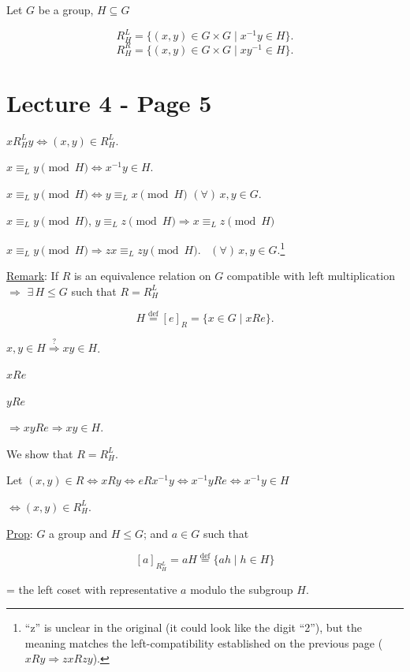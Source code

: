 \bigskip
\noindent Let $G$ be a group, $H\subseteq G$

\[
R_H^L = \{(x,y)\in G\times G \mid x^{-1}y\in H\}.
\]
\[
R_H^R = \{(x,y)\in G\times G \mid xy^{-1}\in H\}.
\]



\section*{Lecture 4 - Page 5}

\noindent $xR_H^L y \Leftrightarrow (x,y)\in R_H^L$.

\noindent $x\equiv_L y \pmod H \Leftrightarrow x^{-1}y\in H$.

\bigskip
\noindent $x\equiv_L y \pmod H \Leftrightarrow y\equiv_L x \pmod H$ $(\forall)\, x,y\in G$.

\noindent $x\equiv_L y \pmod H$, $y\equiv_L z \pmod H \Rightarrow x\equiv_L z \pmod H$

\bigskip
\noindent $x\equiv_L y \pmod H \Rightarrow zx\equiv_L zy \pmod H$. \ $(\forall)\, x,y\in G$.\footnote{``z'' is unclear in the original (it could look like the digit ``2''), but the meaning matches the left-compatibility established on the previous page ($xRy\Rightarrow zxRzy$).}

\bigskip
\noindent\underline{Remark}: If $R$ is an equivalence relation on $G$ compatible with left multiplication $\Rightarrow$ $\exists\, H\leq G$ such that $R=R_H^L$

\[
H \overset{\text{def}}{=} [e]_R = \{x\in G \mid xRe\}.
\]

\noindent $x,y\in H \overset{?}{\Rightarrow} xy\in H$.

\noindent $xRe$

\noindent $yRe$

\noindent $\Rightarrow xyRe \Rightarrow xy\in H$.

\bigskip
\noindent We show that $R=R_H^L$.

\noindent Let $(x,y)\in R \Leftrightarrow xRy \Leftrightarrow eRx^{-1}y \Leftrightarrow x^{-1}yRe \Leftrightarrow x^{-1}y\in H$

\noindent $\Leftrightarrow (x,y)\in R_H^L$.

\bigskip
\noindent\underline{Prop}: $G$ a group and $H\leq G$; and $a\in G$ such that

\[
[a]_{R_H^L} = aH \overset{\text{def}}{=} \{ah \mid h\in H\}
\]

\noindent = the left coset with representative $a$ modulo the subgroup $H$.

